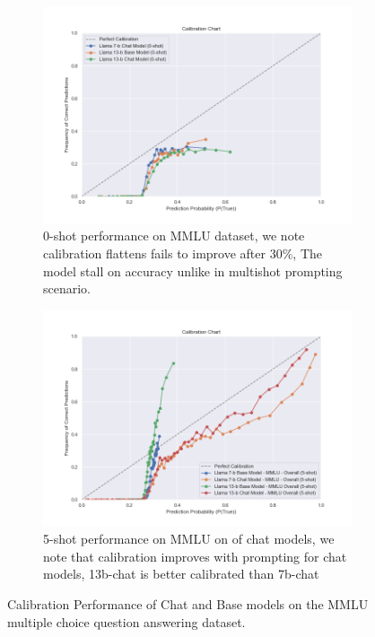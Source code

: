\documentclass[11pt]{article}
\begin{document}
\begin{figure}
     \centering
     \begin{subfigure}[b]{0.49\textwidth}
         \centering \includegraphics[width=1.3\textwidth]{figures/0-shot-13-b-chat-vs-13-b-hf}
         \caption{0-shot performance on MMLU dataset, we note calibration flattens fails to improve after 30\%, The model stall on accuracy unlike in multishot prompting scenario.}
         \label{fig:0-shot-MMLU}
     \end{subfigure}
     \hfill
     \begin{subfigure}[b]{0.49\textwidth}
         \centering
         \includegraphics[width=1.3\textwidth]{figures/5-shot-MMLU.png}
         \caption{5-shot performance on MMLU on of chat models, we note that calibration improves with prompting for chat models, 13b-chat is better calibrated than 7b-chat}
         \label{fig:5-shot-logicqa}
     \end{subfigure}     
        \caption{Calibration Performance of Chat and Base models on the MMLU multiple choice question answering dataset.}
        \label{fig:three graphs}
\end{figure}
\end{document}
